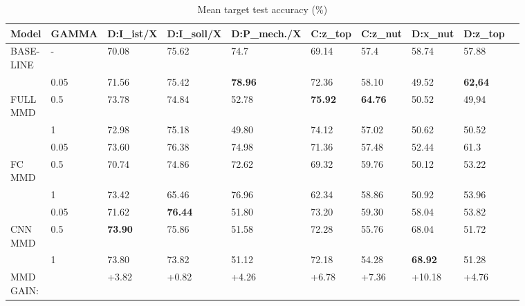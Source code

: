 \begin{sidewaystable}
\begin {table}[H]
\centering
\begin{tabular}{llllllllll}
  \toprule
  Model          & GAMMA    & D:I\_ist/X & D:I\_soll/X & D:P\_mech./X & C:z\_top & C:z\_nut & D:x\_nut & D:z\_top \\
  \midrule
  
  \vspace{1cm}
  
    \thead{BASE- \\ LINE}  & -      & 70.08 & 75.62 & 74.7 & 69.14 & 57.4 & 58.74 & 57.88\\


 
                            & 0.05   & 71.56 & 75.42 & \textbf{78.96} & 72.36 & 58.10 & 49.52 & \textbf{62,64}\\
    \thead{FULL \\ MMD}     & 0.5    & 73.78 & 74.84 & 52.78 & \textbf{75.92} & \textbf{64.76} & 50.52 & 49,94\\
    
    \vspace{1cm}
    
                            & 1      & 72.98 & 75.18 & 49.80 & 74.12 & 57.02 & 50.62 & 50.52\\


                            & 0.05   & 73.60 & 76.38 & 74.98 & 71.36 & 57.48 & 52.44 & 61.3\\
    \thead{FC \\ MMD}       & 0.5    & 70.74 & 74.86 & 72.62 & 69.32 & 59.76 & 50.12 & 53.22\\
    
    \vspace{1cm}
    
                            & 1      & 73.42 & 65.46 & 76.96 & 62.34 & 58.86 & 50.92 & 53.96\\

                            & 0.05   & 71.62 & \textbf{76.44} & 51.80 & 73.20 & 59.30 & 58.04 & 53.82\\
    \thead{CNN \\ MMD}      & 0.5    & \textbf{73.90} & 75.86 & 51.58 & 72.28 & 55.76 & 68.04 & 51.72\\
                            & 1      & 73.80 & 73.82 & 51.12 & 72.18 & 54.28 & \textbf{68.92} & 51.28\\
 \addlinespace
 \hline
 \thead{MMD\\GAIN:} &  & +3.82 & +0.82 & +4.26 & +6.78 & +7.36 & +10.18 & +4.76\\
 
  \bottomrule
\end{tabular}
\caption {Mean target test accuracy (\%)} \label{tab:Mean_Accuracy} 
\end {table}
\end{sidewaystable}


